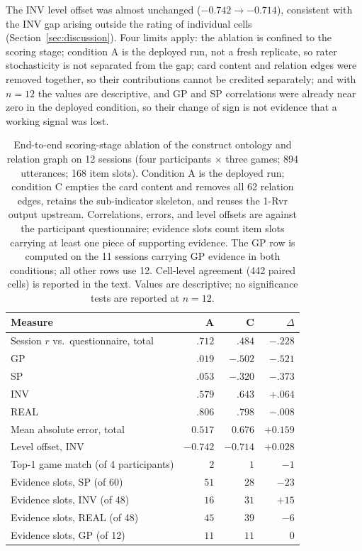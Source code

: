 The INV level offset was almost unchanged ($-0.742 \rightarrow -0.714$), consistent with the INV gap arising outside the rating of individual cells (Section~\ref{sec:discussion}). Four limits apply: the ablation is confined to the scoring stage; condition A is the deployed run, not a fresh replicate, so rater stochasticity is not separated from the gap; card content and relation edges were removed together, so their contributions cannot be credited separately; and with $n=12$ the values are descriptive, and GP and SP correlations were already near zero in the deployed condition, so their change of sign is not evidence that a working signal was lost.
\begin{table}[t]
\centering
\caption{End-to-end scoring-stage ablation of the construct ontology and relation graph on 12 sessions (four participants $\times$ three games; 894 utterances; 168 item slots). Condition A is the deployed run; condition C empties the card content and removes all 62 relation edges, retains the sub-indicator skeleton, and reuses the 1-Rvr output upstream. Correlations, errors, and level offsets are against the participant questionnaire; evidence slots count item slots carrying at least one piece of supporting evidence. The GP row is computed on the 11 sessions carrying GP evidence in both conditions; all other rows use 12. Cell-level agreement (442 paired cells) is reported in the text. Values are descriptive; no significance tests are reported at $n=12$.}
\label{tab:ablation_ontoC}
\small
\begin{tabular}{lrrr}
\hline
Measure & A & C & $\Delta$ \\
\hline
Session $r$ vs.\ questionnaire, total & $.712$ & $.484$ & $-.228$ \\
\quad GP & $.019$ & $-.502$ & $-.521$ \\
\quad SP & $.053$ & $-.320$ & $-.373$ \\
\quad INV & $.579$ & $.643$ & $+.064$ \\
\quad REAL & $.806$ & $.798$ & $-.008$ \\
Mean absolute error, total & $0.517$ & $0.676$ & $+0.159$ \\
Level offset, INV & $-0.742$ & $-0.714$ & $+0.028$ \\
Top-1 game match (of 4 participants) & $2$ & $1$ & $-1$ \\
Evidence slots, SP (of 60) & $51$ & $28$ & $-23$ \\
Evidence slots, INV (of 48) & $16$ & $31$ & $+15$ \\
Evidence slots, REAL (of 48) & $45$ & $39$ & $-6$ \\
Evidence slots, GP (of 12) & $11$ & $11$ & $0$ \\
\hline
\end{tabular}
\end{table}

